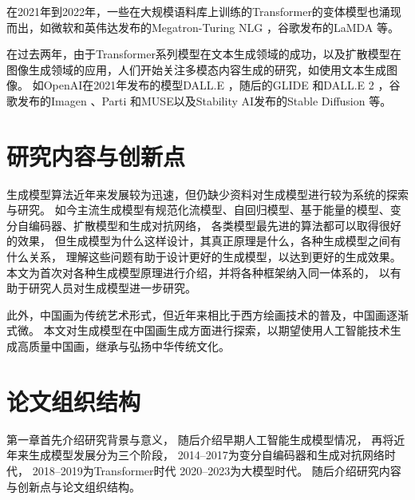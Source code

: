 在2021年到2022年，一些在大规模语料库上训练的Transformer的变体模型也涌现而出，如微软和英伟达发布的Megatron-Turing NLG {\cite{smith2022using}}，谷歌发布的LaMDA {\cite{thoppilan2022lamda}}等。

在过去两年，由于Transformer系列模型在文本生成领域的成功，以及扩散模型在图像生成领域的应用，人们开始关注多模态内容生成的研究，如使用文本生成图像。
如OpenAI在2021年发布的模型DALL.E {\cite{ramesh2021zero}}，随后的GLIDE {\cite{nichol2021glide}}和DALL.E 2 {\cite{ramesh2022hierarchical}}，谷歌发布的Imagen {\cite{saharia2022photorealistic}}、Parti {\cite{yu2022scaling}}和MUSE以及Stability AI发布的Stable Diffusion {\cite{rombach2022high}}等。
\section{研究内容与创新点}
生成模型算法近年来发展较为迅速，但仍缺少资料对生成模型进行较为系统的探索与研究。
如今主流生成模型有规范化流模型、自回归模型、基于能量的模型、变分自编码器、扩散模型和生成对抗网络，
各类模型最先进的算法都可以取得很好的效果，
但生成模型为什么这样设计，其真正原理是什么，各种生成模型之间有什么关系，
理解这些问题有助于设计更好的生成模型，以达到更好的生成效果。
本文为首次对各种生成模型原理进行介绍，并将各种框架纳入同一体系的，
以有助于研究人员对生成模型进一步研究。

此外，中国画为传统艺术形式，但近年来相比于西方绘画技术的普及，中国画逐渐式微。
本文对生成模型在中国画生成方面进行探索，以期望使用人工智能技术生成高质量中国画，继承与弘扬中华传统文化。





\section{论文组织结构}

第一章首先介绍研究背景与意义，
随后介绍早期人工智能生成模型情况，
再将近年来生成模型发展分为三个阶段，
2014–2017为变分自编码器和生成对抗网络时代，
2018–2019为Transformer时代
2020–2023为大模型时代。
随后介绍研究内容与创新点与论文组织结构。

